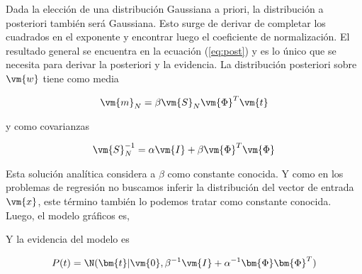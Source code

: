 \documentclass[a4paper,10pt]{article}
\begin{document}
Dada la elecci\'on de una distribuci\'on Gaussiana a priori, la distribuci\'on a posteriori tambi\'en ser\'a Gaussiana.
Esto surge de derivar de completar los cuadrados en el exponente y encontrar luego el coeficiente de normalizaci\'on.
El resultado general se encuentra en la ecuaci\'on (\ref{eq:post}) y es lo \'unico que se necesita para derivar la posteriori y la evidencia.
La distribuci\'on posteriori sobre $\vm{w}$ tiene como media

\begin{equation}
 \vm{m}_N = \beta  \vm{S}_N\vm{\Phi}^T \vm{t}
\end{equation}

y como covarianzas

\begin{equation}
 \vm{S}_N^{-1} = \alpha \vm{I} + \beta \vm{\Phi}^T\vm{\Phi}
\end{equation}

Esta soluci\'on anal\'itica considera a $\beta$ como constante conocida.
Y como en los problemas de regresi\'on no buscamos inferir la distribuci\'on del vector de entrada $\vm{x}$, este t\'ermino tambi\'en lo podemos tratar como constante conocida.
Luego, el modelo gr\'aficos es, 

\begin{figure}[H]
    \centering
\end{figure}

Y la evidencia del modelo es

\begin{equation}
 P(t) = \N(\bm{t}| \vm{0}, \beta^{-1} \vm{I} + \alpha^{-1}\bm{\Phi}\bm{\Phi}^T  )
\end{equation}
\end{document}
